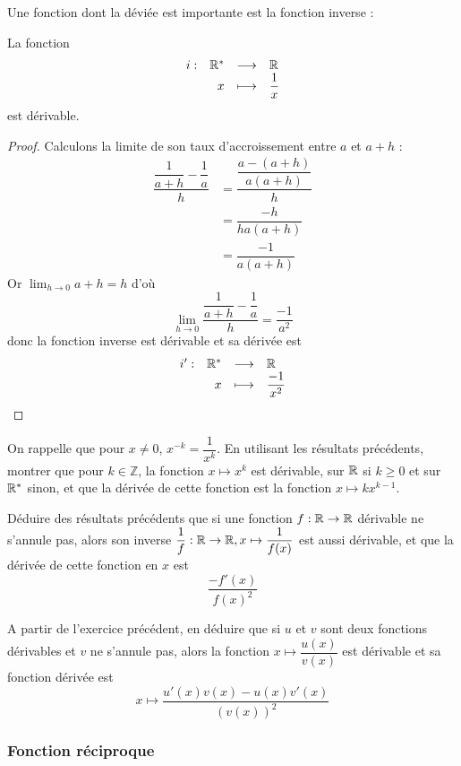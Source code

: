 Une fonction dont la déviée est importante est la fonction inverse :

\begin{prop}
    La fonction $$\begin{array}[t]{lrcl} i: & \mathbb{R}^* & \longrightarrow & \mathbb{R} \\ & x & \longmapsto & \displaystyle\frac{1}{x} \end{array}$$ est dérivable.
\end{prop}

\begin{proof}
    Calculons la limite de son taux d'accroissement entre $a$ et $a+h$ :
    \begin{align*}
        \dfrac{\dfrac{1}{a+h}-\dfrac{1}{a}}{h} &= \dfrac{\dfrac{a-(a+h)}{a(a+h)}}{h}\\
        &= \dfrac{-h}{ha(a+h)}\\
        &= \dfrac{-1}{a(a+h)}
    \end{align*}
    Or $\displaystyle\lim_{h\to 0}a+h = h$ d'où $$\boxed{\lim_{h\to 0} \dfrac{\dfrac{1}{a+h}-\dfrac{1}{a}}{h} =\dfrac{-1}{a^2}}$$ donc la fonction inverse est dérivable et sa dérivée est $$\begin{array}[t]{lrcl} i': & \mathbb{R}^* & \longrightarrow & \mathbb{R} \\ & x & \longmapsto & \dfrac{-1}{x^2} \end{array}$$
\end{proof}

\begin{exo}
    On rappelle que pour $x\neq 0$, $x^{-k}=\dfrac{1}{x^k}$. En utilisant les résultats précédents, montrer que pour $k\in\mathbb Z$, la fonction $x\mapsto x^k$ est dérivable, sur $\mathbb{R}$ si $k\geq 0$ et  sur $\mathbb{R}^*$ sinon, et que la dérivée de cette fonction est la fonction $x\mapsto k x^{k-1}$.
\end{exo}

\begin{exo}
    Déduire des résultats précédents que si une fonction $f : \mathbb{R}\to\mathbb{R}$ dérivable ne s'annule pas, alors son inverse $\dfrac{1}{f} : \mathbb{R}\to\mathbb{R},x\mapsto \dfrac{1}{f(x)}$ est aussi dérivable, et que la dérivée de cette fonction en $x$ est $$\dfrac{-f'(x)}{f(x)^2}$$
\end{exo}

\begin{exo}
    A partir de l'exercice précédent, en déduire que si $u$ et $v$ sont deux fonctions dérivables et $v$ ne s'annule pas, alors la fonction $x\mapsto \dfrac{u(x)}{v(x)}$ est dérivable et sa fonction dérivée est $$x\mapsto \dfrac{u'(x)v(x)-u(x)v'(x)}{(v(x))^2}$$
\end{exo}

\subsubsection{Fonction réciproque}


